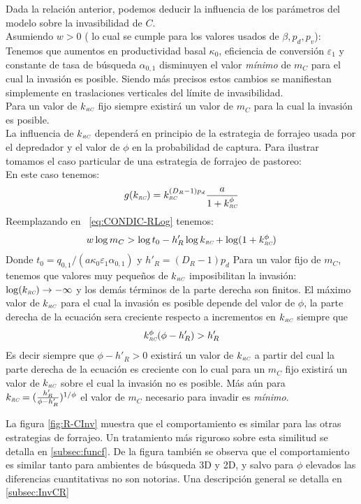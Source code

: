 Dada la relaci\'on anterior, podemos deducir la influencia de los par\'ametros del modelo sobre la invasibilidad de $C$.\\
Asumiendo $w > 0$ ( lo cual se cumple para los valores usados de $\beta, p_d, p_v$): \\
Tenemos que aumentos en productividad basal $\kappa_0$, eficiencia de conversi\'on $\varepsilon_1$ y constante de tasa de b\'usqueda $\alpha_{0,1}$ disminuyen el valor \emph{m\'inimo} de $m_C$ para el cual la invasi\'on es posible. Siendo m\'as precisos estos cambios se manifiestan simplemente en traslaciones verticales del l\'imite de invasibilidad.\\
Para un valor de $k_{\textit{\tiny RC}}$ fijo siempre existir\'a un valor de $m_C$ para la cual la invasi\'on es posible.\\
La influencia de $k_{\textit{\tiny RC}}$ depender\'a en principio de la estrategia de forrajeo usada por el depredador y el valor de $\phi$ en la probabilidad de captura. Para ilustrar tomamos el caso particular de una estrategia de forrajeo de pastoreo:\\
En este caso tenemos:
\[ g(k_{\textit{\tiny RC}}) = k_{\textit{\tiny RC}}^{(D_R -1)p_d} \frac{a}{1+k_{\textit{\tiny RC}}^\phi} \]
Reemplazando en ~\eqref{eq:CONDIC-RLog} tenemos:
\begin{equation}
  \label{eq:CONIC-RLOGGRAZING}
  w \log m_C > \log{t_0} - h'_R\log{k_{\textit{\tiny RC}}} + \log(1+k_{\textit{\tiny RC}}^\phi)
\end{equation}
Donde $t_0 = q_{0,1} / (a \kappa_0 \varepsilon_1 \alpha_{0,1})$ y $h'_R = (D_R -1)p_d$
Para un valor fijo de $m_C$, tenemos que valores muy peque\~nos de $k_{\textit{\tiny RC}}$ imposibilitan la invasi\'on: $\log(k_{\textit{\tiny RC}}) \to -\infty$ y los dem\'as t\'erminos de la parte derecha son finitos. El m\'aximo valor de $k_{\textit{\tiny RC}}$ para el cual la invasi\'on es posible depende del valor de $\phi$, la parte derecha de la ecuaci\'on sera creciente respecto a incrementos en $k_{\textit{\tiny RC}}$ siempre que
\begin{equation}
  \label{eq:ROCKRCIC-R}
  k_{\textit{\tiny RC}}^\phi(\phi - h'_R) > h'_R
\end{equation}
Es decir siempre que $\phi - h'_R > 0$ existir\'a un valor de $k_{\textit{\tiny RC}}$ a partir del cual la parte derecha de la ecuaci\'on es creciente con lo cual para un $m_C$ fijo existir\'a un valor de $k_{\textit{\tiny RC}}$ sobre el cual la invasi\'on no es posible. M\'as a\'un para $k_{\textit{\tiny RC}} = (\frac{h'_R}{\phi - h'_R})^{1/\phi}$ el valor de $m_C$ necesario para invadir es \emph{m\'inimo}.

La figura \ref{fig:R-CInv} muestra que el comportamiento es similar para las otras estrategias de forrajeo. Un tratamiento m\'as riguroso sobre esta similitud se detalla en \ref{subsec:funcf}.  De la figura tambi\'en se observa que el comportamiento es similar tanto para ambientes de b\'usqueda 3D y 2D, y salvo para $\phi$ elevados las diferencias cuantitativas no son notorias. Una descripci\'on general se detalla en  \ref{subsec:InvCR}

